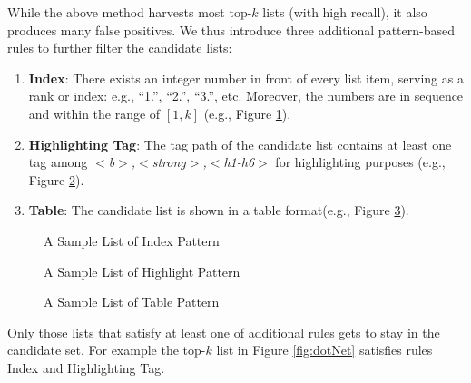%
While the above method harvests most top-$k$ lists (with high recall),
it also produces many false positives.
We thus introduce three additional pattern-based rules to further filter
the candidate lists:

\begin{enumerate}
\item \textbf{Index}:
There exists an integer number in front of every list item, serving as
a rank or index: e.g., ``1.'', ``2.'', ``3.'', etc.
Moreover, the numbers are in sequence and within the range of
$[1, k]$ (e.g., Figure \ref{fig:indexPattern}).

\item \textbf{Highlighting Tag}:
The tag path of the candidate list contains at least one tag
among {\em $<$b$>$,$<$strong$>$,$<$h1-h6$>$} for highlighting purposes
(e.g., Figure \ref{fig:highlightPattern}).

\item \textbf{Table}:
The candidate list is shown in a table format(e.g., Figure \ref{fig:tablePattern}).
\end{enumerate}

\begin{figure}[th]
\centering
{}
\caption{A Sample List of Index Pattern\cite{Top20Books}}
\label{fig:indexPattern}
\end{figure}

\begin{figure}[th]
\centering
{}
\caption{A Sample List of Highlight Pattern\cite{highlightPattern}}
\label{fig:highlightPattern}
\end{figure}

\begin{figure}[th]
\centering
{}
\caption{A Sample List of Table Pattern\cite{tablePattern}}
\label{fig:tablePattern}
\end{figure}

Only those lists that satisfy at least one of additional rules
gets to stay in the candidate set. For
example the top-$k$ list in Figure \ref{fig:dotNet}
satisfies rules Index and Highlighting Tag.


